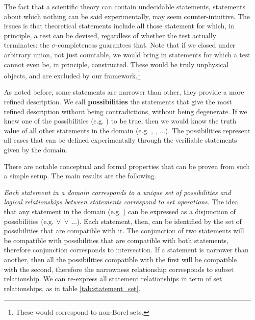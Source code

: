 \documentclass[twocolumn]{article}
\begin{document}
The fact that a scientific theory can contain undecidable statements, statements about which nothing can be said experimentally, may seem counter-intuitive. The issues is that theoretical statements include all those statement for which, in principle, a test can be devised, regardless of whether the test actually terminates: the $\sigma$-completeness guarantees that. Note that if we closed under arbitrary union, not just countable, we would bring in statements for which a test cannot even be, in principle, constructed. These would be truly unphysical objects, and are excluded by our framework.\footnote{These would correspond to non-Borel sets.}

As noted before, some statements are narrower than other, they provide a more refined description. We call \textbf{possibilities} the statements that give the most refined description without being contradictions, without being degenerate. If we knew one of the possibilities (e.g. ) to be true, then we would know the truth value of all other statements in the domain (e.g. , , ...). The possibilities represent all cases that can be defined experimentally through the verifiable statements given by the domain.

There are notable conceptual and formal properties that can be proven from such a simple setup. The main results are the following.

\textit{Each statement in a domain corresponds to a unique set of possibilities and logical relationships between statements correspond to set operations.} The idea that any statement in the domain (e.g. ) can be expressed as a disjunction of possibilities (e.g.  $\vee$  $\vee$ ...). Each statement, then, can be identified by the set of possibilities that are compatible with it. The conjunction of two statements will be compatible with possibilities that are compatible with both statements, therefore conjunction corresponds to intersection. If a statement is narrower than another, then all the possibilities compatible with the first will be compatible with the second, therefore the narrowness relationship corresponds to subset relationship. We can re-express all statement relationships in term of set relationships, as in table \ref{tab:statement_set}.
\end{document}
